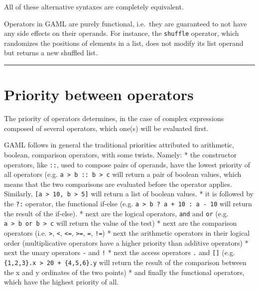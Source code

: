 \documentclass[]{book}
\theoremstyle{definition}
\theoremstyle{definition}
\theoremstyle{definition}
\theoremstyle{remark}
\begin{document}
All of these alternative syntaxes are completely equivalent.

Operators in GAML are purely functional, i.e.~they are guaranteed to not
have any side effects on their operands. For instance, the
\texttt{shuffle} operator, which randomizes the positions of elements in
a list, does not modify its list operand but returns a new shuffled
list.

\begin{center}\rule{0.5\linewidth}{\linethickness}\end{center}

\section{Priority between operators}\label{priority-between-operators-3}

The priority of operators determines, in the case of complex expressions
composed of several operators, which one(s) will be evaluated first.

GAML follows in general the traditional priorities attributed to
arithmetic, boolean, comparison operators, with some twists. Namely: *
the constructor operators, like \texttt{::}, used to compose pairs of
operands, have the lowest priority of all operators (e.g.
\texttt{a\ \textgreater{}\ b\ ::\ b\ \textgreater{}\ c} will return a
pair of boolean values, which means that the two comparisons are
evaluated before the operator applies. Similarly,
\texttt{{[}a\ \textgreater{}\ 10,\ b\ \textgreater{}\ 5{]}} will return
a list of boolean values. * it is followed by the \texttt{?:} operator,
the functional if-else (e.g.
\texttt{a\ \textgreater{}\ b\ ?\ a\ +\ 10\ :\ a\ -\ 10} will return the
result of the if-else). * next are the logical operators, \texttt{and}
and \texttt{or} (e.g.
\texttt{a\ \textgreater{}\ b\ or\ b\ \textgreater{}\ c} will return the
value of the test) * next are the comparison operators (i.e.
\texttt{\textgreater{}}, \texttt{\textless{}}, \texttt{\textless{}=},
\texttt{\textgreater{}=}, \texttt{=}, \texttt{!=}) * next the arithmetic
operators in their logical order (multiplicative operators have a higher
priority than additive operators) * next the unary operators \texttt{-}
and \texttt{!} * next the access operators \texttt{.} and
\texttt{{[}{]}} (e.g.
\texttt{\{1,2,3\}.x\ \textgreater{}\ 20\ +\ \{4,5,6\}.y} will return the
result of the comparison between the x and y ordinates of the two
points) * and finally the functional operators, which have the highest
priority of all.
\end{document}
